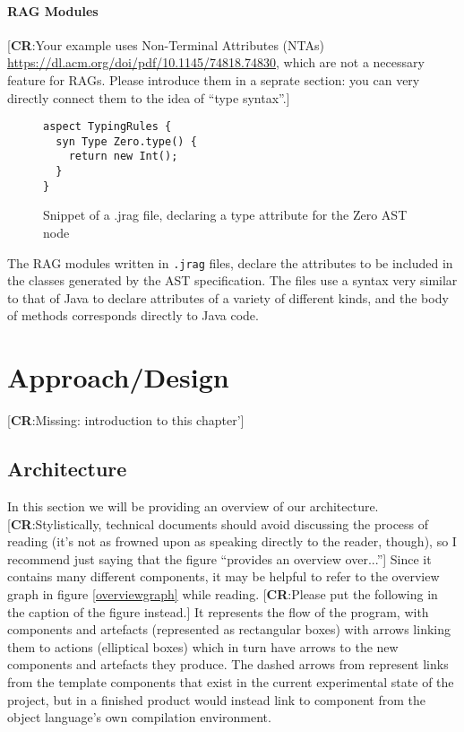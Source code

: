 \documentclass[nofilelist]{cslthse-msc}
\newcommand{\CR}[1]{\textcolor{green!60!black}{[\textbf{CR}:#1]}}
\begin{document}
\subsubsection{RAG Modules}
\CR{Your example uses Non-Terminal Attributes (NTAs) \url{https://dl.acm.org/doi/pdf/10.1145/74818.74830}, which are
not a necessary feature for RAGs.  Please introduce them in a seprate section: you can very directly connect them to the idea of ``type syntax''.}
\begin{figure}[h]
\begin{lstlisting}[language=jrag]
aspect TypingRules {
  syn Type Zero.type() {
    return new Int();
  }
}
\end{lstlisting}
  \caption{Snippet of a .jrag file, declaring a type attribute for the Zero AST node}
  \label{boolstrgen}
\end{figure}
The RAG modules written in \verb|.jrag| files, declare the attributes to be included in the classes generated by the AST specification.
The files use a syntax very similar to that of Java to declare attributes of a variety of different kinds, and the body of methods corresponds directly to Java code.

\chapter{Approach/Design} %

\CR{Missing: introduction to this chapter'}


\section{Architecture}
In this section we will be providing an overview of our architecture.
\CR{Stylistically, technical documents should avoid discussing the process of reading (it's not as frowned upon as speaking directly to the reader, though), so I recommend just saying that the figure ``provides an overview over...''}
Since it contains many different components, it may be helpful to refer to the overview graph in figure \ref{overviewgraph} while reading.
\CR{Please put the following in the caption of the figure instead.}
It represents the flow of the program, with components and artefacts (represented as rectangular boxes) with arrows linking them to actions (elliptical boxes) which in turn have arrows to the new components and artefacts they produce.
The dashed arrows from represent links from the template components that exist in the current experimental state of the project, but in a finished product would instead link to component from the object language's own compilation environment.
\end{document}
